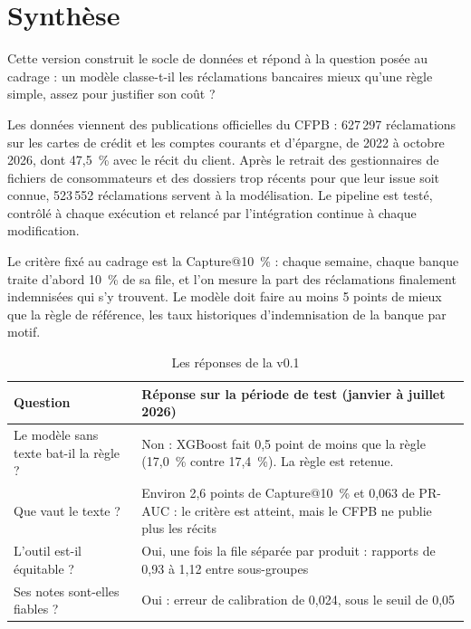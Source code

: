 \documentclass[11pt,a4paper]{article}
\begin{document}

\section*{Synthèse}

Cette version construit le socle de données et répond à la question posée au cadrage : un modèle classe-t-il les réclamations bancaires mieux qu'une règle simple, assez pour justifier son coût ?

Les données viennent des publications officielles du CFPB : 627\,297 réclamations sur les cartes de crédit et les comptes courants et d'épargne, de 2022 à octobre 2026, dont 47,5~\% avec le récit du client. Après le retrait des gestionnaires de fichiers de consommateurs et des dossiers trop récents pour que leur issue soit connue, 523\,552 réclamations servent à la modélisation. Le pipeline est testé, contrôlé à chaque exécution et relancé par l'intégration continue à chaque modification.

Le critère fixé au cadrage est la Capture@10~\% : chaque semaine, chaque banque traite d'abord 10~\% de sa file, et l'on mesure la part des réclamations finalement indemnisées qui s'y trouvent. Le modèle doit faire au moins 5 points de mieux que la règle de référence, les taux historiques d'indemnisation de la banque par motif.

\begin{table}[H]
\centering\small
\begin{tabularx}{\linewidth}{@{}l Y@{}}
\toprule
Question & Réponse sur la période de test (janvier à juillet 2026) \\
\midrule
Le modèle sans texte bat-il la règle ? & Non : XGBoost fait 0,5 point de moins que la règle (17,0~\% contre 17,4~\%). La règle est retenue. \\
Que vaut le texte ? & Environ 2,6 points de Capture@10~\% et 0,063 de PR-AUC : le critère est atteint, mais le CFPB ne publie plus les récits \\
L'outil est-il équitable ? & Oui, une fois la file séparée par produit : rapports de 0,93 à 1,12 entre sous-groupes \\
Ses notes sont-elles fiables ? & Oui : erreur de calibration de 0,024, sous le seuil de 0,05 \\
\bottomrule
\end{tabularx}
\caption{Les réponses de la v0.1}
\end{table}
\end{document}
